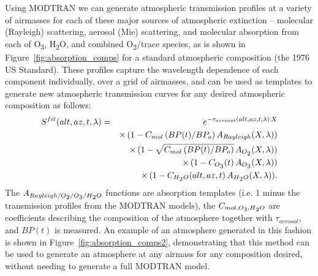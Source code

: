 \documentclass[12pt,preprint]{aastex}
\newcommand{\water}   {H\textsubscript{2}O}
\newcommand{\ozone}    {O\textsubscript{3}}
\newcommand{\oxy}     {O\textsubscript{2}}
\begin{document}
Using MODTRAN we can generate atmospheric transmission profiles at a
variety of airmasses for
each of these major sources of atmospheric extinction -- molecular
(Rayleigh) scattering, aerosol (Mie) scattering, and molecular
absorption from each of \ozone, \water, and combined \oxy/trace species, as is
shown in Figure~\ref{fig:absorption_comps} for a standard atmospheric
composition (the 1976 US Standard). These
profiles capture the wavelength dependence of each component
individually, over a grid of airmasses, and can be used as
templates to generate new atmospheric transmission curves for any
desired atmospheric composition as follows:
\begin{eqnarray}
S^{fit}(alt,az,t, \lambda) & = & \,e^{-\tau_{aerosol}(alt,az,t,\lambda)\,X} \nonumber \\
 & & \times \, (1 - C_{mol}\, (BP(t) / BP_o) \, A_{Rayleigh}(X, \lambda)) \nonumber \\
 & & \times \, (1 - \sqrt{ C_{mol}\, (BP(t) / BP_o)} \, A_{\oxy}(X, \lambda)) \nonumber \\
 & & \times \, (1 - C_{\ozone}(t) \, A_{\ozone}(X, \lambda)) \nonumber \\
 & & \times \, (1 - C_{\water}(alt,az,t)\,A_{\water}(X, \lambda)).
\label{eqn:atmo_fit}
\end{eqnarray}
The $A_{Rayleigh/\oxy/\ozone/\water}$ functions are
absorption templates (i.e. 1 minus the transmission profiles from the
MODTRAN models), the $C_{mol,\ozone,\water}$ are
coefficients describing the composition of the atmosphere together
with $\tau_{aerosol}$, and $BP(t)$ is measured. An example of an
atmosphere generated in this fashion is shown in
Figure~\ref{fig:absorption_comps2}, demonstrating that this method can
be used to generate an atmosphere at any airmass for any composition
desired, without needing to generate a full MODTRAN model. 
\end{document}
